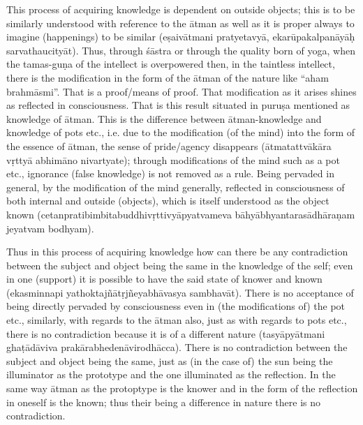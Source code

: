 
This process of acquiring knowledge is dependent on outside objects; this is to be similarly understood with reference to the ātman as well as it is proper always to imagine (happenings) to be similar (eṣaivātmani pratyetavyā, ekarūpakalpanāyāḥ sarvathaucityāt). Thus, through śāstra or through the quality born of yoga, when the tamas-guṇa of the intellect is overpowered then, in the taintless intellect, there is the modification in the form of the ātman of the nature like “aham brahmāsmi”. That is a proof/means of proof. That modification as it arises shines as reflected in consciousness. That is this result situated in puruṣa mentioned as knowledge of ātman. This is the difference between ātman-knowledge and knowledge of pots etc., i.e. due to the modification (of the mind) into the form of the essence of ātman, the sense of pride/agency disappears (ātmatattvākāra vṛttyā abhimāno nivartyate); through modifications of the mind such as a pot etc., ignorance (false knowledge) is not removed as a rule. Being pervaded in general, by the modification of the mind generally, reflected in consciousness of both internal and outside (objects), which is itself understood as the object known (cetanpratibimbitabuddhivṛttivyāpyatvameva bāhyābhyantarasādhāraṇam jeyatvam bodhyam). 

Thus in this process of acquiring knowledge how can there be any contradiction between the subject and object being the same in the knowledge of the self;  even in one (support) it is possible to have the said state of knower and known (ekasminnapi yathoktajñātṛjñeyabhāvasya sambhavāt). There is no acceptance of being directly pervaded by consciousness even in (the modifications of) the pot etc., similarly, with regards to the ātman also, just as with regards to pots etc., there is no contradiction because it is of a different nature (tasyāpyātmani ghaṭādāviva prakārabhedenāvirodhācca). There is no contradiction between the subject and object being the same, just as (in the case of) the sun being the illuminator as the prototype and the one illuminated as the reflection. In the same way ātman as the protoptype is the knower and in the form of the reflection in oneself is the known; thus their being a difference in nature there is no contradiction.

